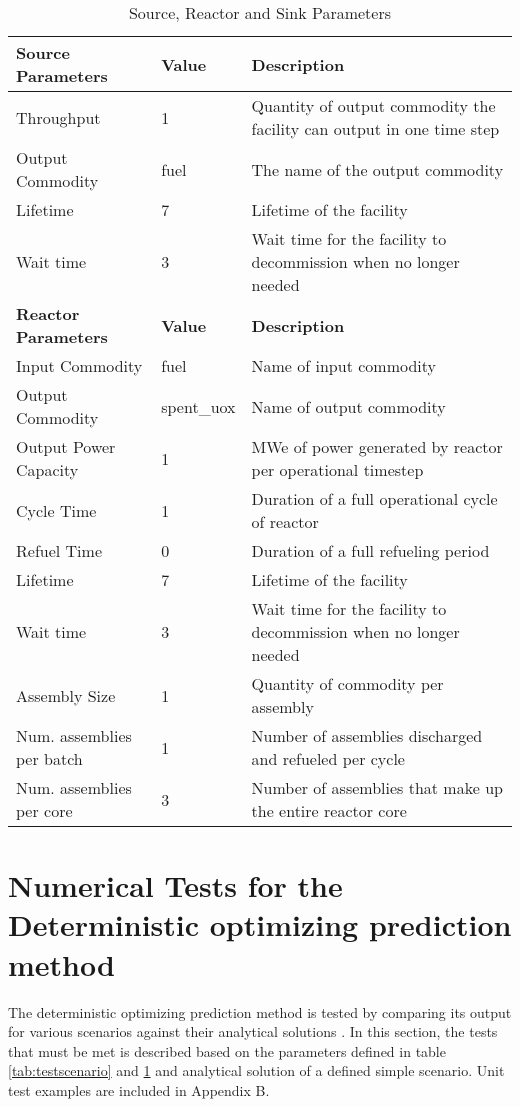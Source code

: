\documentclass[11pt,letterpaper]{article}
\begin{document}
\begin{table}[H]
	\centering
    \caption {Source, Reactor and Sink Parameters}
	\label{tab:reactor}
	\begin{tabular}{|l|l|l|}
\hline
\textbf{Source Parameters} & \textbf{Value} & \textbf{Description} \\
\hline
Throughput & 1 & Quantity of output commodity the facility can output in one time step \\
Output Commodity & fuel & The name of the output commodity\\
Lifetime & 7 & Lifetime of the facility \\
Wait time & 3 & Wait time for the facility to decommission when no longer needed \\
\hline
\textbf{Reactor Parameters} & \textbf{Value} & \textbf{Description} \\
\hline
Input Commodity & fuel & Name of input commodity\\
Output Commodity & spent\_uox & Name of output commodity\\
Output Power Capacity & 1& MWe of power generated by reactor per operational timestep\\
Cycle Time & 1 & Duration of a full operational cycle of reactor\\
Refuel Time & 0 & Duration of a full refueling period \\
Lifetime & 7 & Lifetime of the facility \\
Wait time & 3 & Wait time for the facility to decommission when no longer needed \\
Assembly Size & 1 & Quantity of commodity per assembly \\
Num. assemblies per batch & 1 & Number of assemblies discharged and refueled per cycle\\
Num. assemblies per core & 3 & Number of assemblies that make up the entire reactor core \\

\hline
	\end{tabular}
\end{table}

\pagebreak

\section{Numerical Tests for the Deterministic optimizing prediction method}
The deterministic optimizing prediction method is tested by comparing its output for various scenarios against their analytical solutions . In this section, the tests that must be met is described based on the parameters defined in table \ref{tab:testscenario} and \ref{tab:reactor} and analytical solution of a defined simple scenario. Unit test examples are included in Appendix B.
\end{document}
